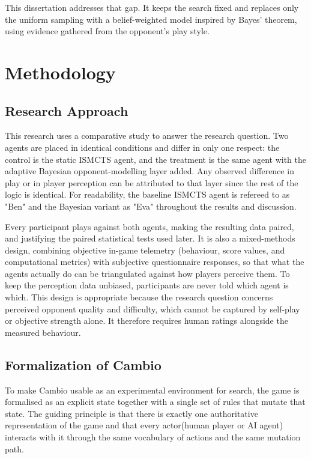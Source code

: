 \documentclass[12pt,a4paper,oneside]{report}
\begin{document}
This dissertation addresses that gap. It keeps the search fixed and replaces only the
uniform sampling with a belief-weighted model inspired by Bayes’ theorem, using evidence gathered from the opponent's play style. 


\chapter{Methodology}\label{chap:methodology}
\label{ch:method}

\section{Research Approach}

This research uses a comparative study to answer the research question. Two agents are placed in identical conditions and differ in only one respect: the control is the static ISMCTS agent, and the treatment is the same agent with the adaptive Bayesian opponent-modelling layer added. Any observed difference in play or in player perception can be attributed to that layer since the rest of the logic is identical. For readability, the baseline ISMCTS agent is refereed to as "Ben" and the Bayesian variant as "Eva" throughout the results and discussion.

Every participant plays against both agents, making the resulting data paired, and justifying the paired statistical tests used later. It is also a mixed-methods design, combining objective in-game telemetry (behaviour, score values, and computational metrics) with subjective questionnaire responses, so that what the agents actually do can be triangulated against how players perceive
them. To keep the perception data unbiased, participants are never told which agent is which. This design is appropriate because the research question concerns perceived opponent quality and difficulty, which cannot be captured by self-play or objective strength alone. It therefore requires human ratings alongside the measured behaviour.

\section{Formalization of Cambio}

To make Cambio usable as an experimental environment for search, the game is
formalised as an explicit state together with a single set of rules that mutate that
state. The guiding principle is that there is exactly one authoritative representation
of the game and that every actor(human player or AI agent) interacts with it through the same vocabulary of actions and the same mutation path.
\end{document}
